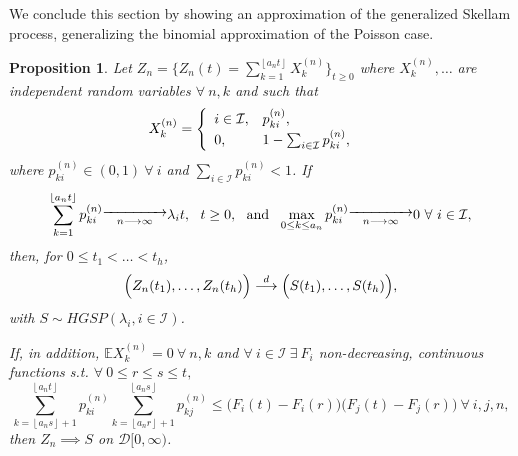 \documentclass[12pt, twoside, english, headsepline]{article}
\newcommand{\floor}[1]{\left\lfloor #1 \right\rfloor}  %
\newtheorem{proposition}{Proposition}[section] %
\theoremstyle{definition} %
\numberwithin{equation}{section} %
\begin{document}
We conclude this section by showing an approximation of the generalized Skellam process, generalizing the binomial approximation of the Poisson case.
\begin{proposition}\label{proposizioneApprossimazioneBinomialeSkellamGeneralizzato}
Let $Z_n = \Big\{Z_n(t) = \sum_{k=1}^{\floor{a_n t}} X_k^{(n)} \Big\}_{t\ge0}$ where $X_k^{(n)},\dots$ are independent random variables $\forall\ n,k$ and such that
\begin{equation}
 X_k^{(n)} = \begin{cases}\begin{array}{l l}
i\in\mathcal{I}, & p_{ki}^{(n)},\\
0, & 1- \sum_{i\in\mathcal{I}} p_{ki}^{(n)},
\end{array}\end{cases}
\end{equation}
where $p_{ki}^{(n)}\in(0,1)\ \forall\ i$ and $\sum_{i\in\mathcal{I}} p_{ki}^{(n)}<1$.
If
\begin{equation}\label{ipotesiApprossimazioneSkellam}
\sum_{k=1}^{\floor{a_n t}}p_{ki}^{(n)}\substack{\xrightarrow{\hspace*{1.4cm}}\\ n\longrightarrow\infty}\lambda_i t,\ \ t\ge0, \ \text{ and }\ \max_{0\le k\le a_n} p_{ki}^{(n)}\substack{\xrightarrow{\hspace*{1.4cm}}\\ n\longrightarrow\infty}0 \ \forall \ i\in\mathcal{I},
\end{equation}
then, for $0\le t_1<\dots< t_h$,
\begin{equation}\label{convergenzaFinitoDimensionaliApprossimazioneSkellam}
\Bigl(Z_n(t_1),\dots, Z_n (t_h)\Bigr)\stackrel{d}{\longrightarrow} \Bigl(S(t_1),\dots, S (t_h)\Bigr),
\end{equation}
with $S\sim HGSP (\lambda_i, i\in \mathcal{I} )$.

If, in addition, $\mathbb{E}X_k^{(n)} = 0\ \forall\ n,k$ and $\forall\ i\in\mathcal{I}\ \exists\ F_i$ non-decreasing, continuous functions s.t. $\forall\ 0\le r\le s\le t,$
\begin{equation}\label{ipotesiConvergenzaDeboleApprossimazioneBinomiale}
 \sum_{k=\floor{a_n s}+1}^{\floor{a_n t}}p_{ki}^{(n)}\sum_{k=\floor{a_n r}+1}^{\floor{a_n s}}p_{kj}^{(n)} \le \bigl(F_i(t)-F_i(r)\bigr)\bigl(F_j(t)-F_j(r)\bigr)\ \forall\ i,j,n,
\end{equation}
then $Z_n \implies S$ on $\mathcal{D}[0,\infty)$.
\end{proposition}
\end{document}
